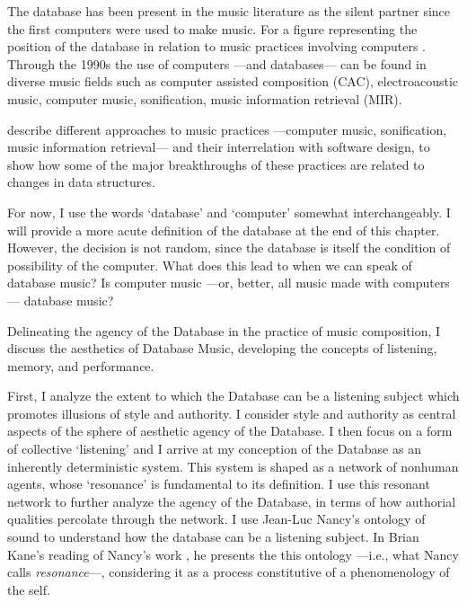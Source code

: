 





The database has been present in the music literature as the silent partner since the first computers were used to make music. For a figure representing the position of the database in relation to music practices involving computers . Through the 1990s the use of computers ---and databases--- can be found in diverse music fields such as computer assisted composition (CAC), electroacoustic music, computer music, sonification, music information retrieval (MIR). 

describe different approaches to music practices ---computer music, sonification, music information retrieval--- and their interrelation with software design, to show how some of the major breakthroughs of these practices are related to changes in data structures. 

For now, I use the words `database' and `computer' somewhat interchangeably. I will provide a more acute definition of the database at the end of this chapter. However, the decision is not random, since the database is itself the condition of possibility of the computer. What does this lead to when we can speak of database music? Is computer music ---or, better, all music made with computers--- database music? 






















Delineating the agency of the Database in the practice of music composition, I discuss the aesthetics of Database Music, developing the concepts of listening, memory, and performance. 

First, I analyze the extent to which the Database can be a listening subject which promotes illusions of style and authority. I consider style and authority as central aspects of the sphere of aesthetic agency of the Database. I then focus on a form of collective `listening' and I arrive at my conception of the Database as an inherently deterministic system. This system is shaped as a network of nonhuman agents, whose `resonance' is fundamental to its definition. I use this resonant network to further analyze the agency of the Database, in terms of how authorial qualities percolate through the network. I use Jean-Luc Nancy's ontology of sound to understand how the database can be a listening subject. In Brian Kane's reading \parencite[143-144]{Gra15:The} of Nancy's work \parencite{Nan07:Lis}, he presents the this ontology ---i.e., what Nancy calls \textit{resonance}---, considering it as a process constitutive of a phenomenology of the self. 


